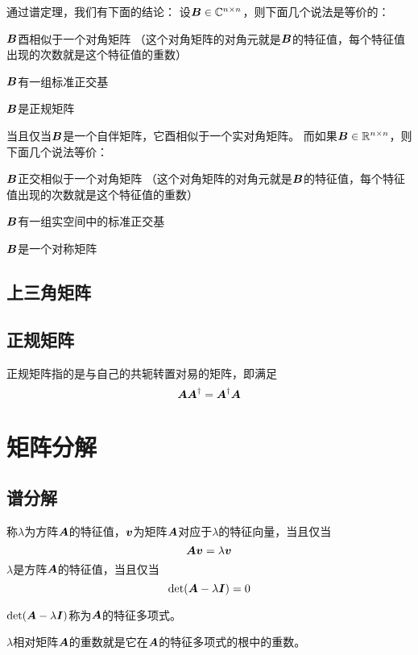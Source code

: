 \documentclass[UTF8]{ctexart}
\newcommand*{\reals}{\mathbb{R}}
\renewcommand*{\reals}{\mathbb{R}}
\newcommand*{\complexes}{\mathbb{C}}
\theoremstyle{definition}
\renewenvironment{itemize}{\begin{compactitem}}{\end{compactitem}}
\begin{document}
通过谱定理，我们有下面的结论：
设$\vb*{B} \in \complexes^{n \times n}$，则下面几个说法是等价的：
\begin{itemize}
    \item $\vb*{B}$酉相似于一个对角矩阵
    （这个对角矩阵的对角元就是$\vb*{B}$的特征值，每个特征值出现的次数就是这个特征值的重数）
    \item $\vb*{B}$有一组标准正交基
    \item $\vb*{B}$是正规矩阵
\end{itemize}
当且仅当$\vb*{B}$是一个自伴矩阵，它酉相似于一个实对角矩阵。
而如果$\vb*{B} \in \reals^{n \times n}$，则下面几个说法等价：
\begin{itemize}
    \item $\vb*{B}$正交相似于一个对角矩阵
    （这个对角矩阵的对角元就是$\vb*{B}$的特征值，每个特征值出现的次数就是这个特征值的重数）
    \item $\vb*{B}$有一组实空间中的标准正交基
    \item $\vb*{B}$是一个对称矩阵
\end{itemize}

\subsection{上三角矩阵}

\subsection{正规矩阵}

正规矩阵指的是与自己的共轭转置对易的矩阵，即满足
\[
    \vb*{A} \vb*{A}^\dagger = \vb*{A}^\dagger \vb*{A}
\]

\section{矩阵分解}

\subsection{谱分解}\label{sec:spectral}

称$\lambda$为方阵$\vb*{A}$的特征值，$\vb*{v}$为矩阵$\vb*{A}$对应于$\lambda$的特征向量，当且仅当
\[
    \vb*{A} \vb*{v} = \lambda \vb*{v}
\]
$\lambda$是方阵$\vb*{A}$的特征值，当且仅当
\[
    \det (\vb*{A} - \lambda \vb*{I}) = 0
\]

$\det (\vb*{A} - \lambda \vb*{I})$称为$\vb*{A}$的特征多项式。 

$\lambda$相对矩阵$\vb*{A}$的重数就是它在$\vb*{A}$的特征多项式的根中的重数。
\end{document}
